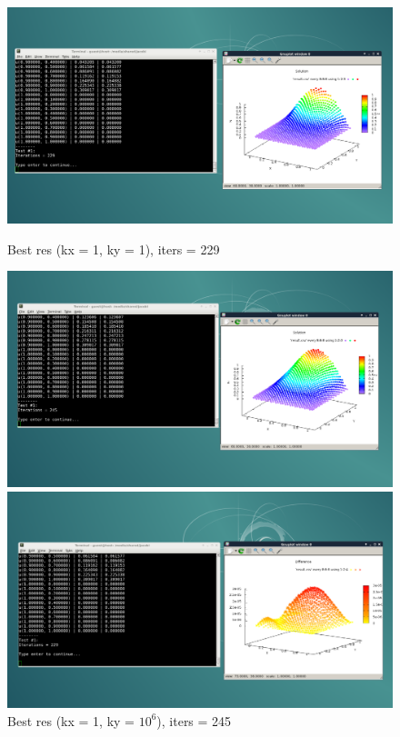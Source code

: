 \documentclass[a4paper, fleqn]{report}
\begin{document}
\newpage
\begin{figure}[h]
    \centering
    \begin{minipage}{0.49\textwidth}
        \centering
        \includegraphics[width=\textwidth]{media/best_res_1_1.png}
        \caption{Best res (kx = 1, ky = 1), iters = 229}
    \end{minipage}%
    \begin{minipage}{0.49\textwidth}
        \centering
        \includegraphics[width=\textwidth]{media/best_res_1_1000000.png}
        \caption{Best res (kx = 1, ky = $10^6$), iters = 245}
    \end{minipage}
    \par\bigskip
    \begin{minipage}{0.49\textwidth}
        \centering
        \includegraphics[width=\textwidth]{media/best_dif_1_1.png}

\end{minipage}
\end{figure}
\end{document}
